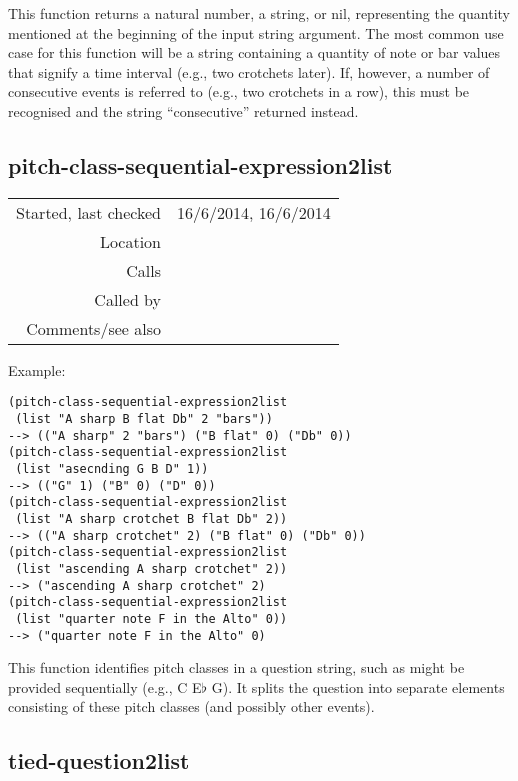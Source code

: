 \noindent This function returns a natural number, a
string, or nil, representing the quantity mentioned
at the beginning of the input string argument. The
most common use case for this function will be a
string containing a quantity of note or bar values
that signify a time interval (e.g., two crotchets
later). If, however, a number of consecutive events is
referred to (e.g., two crotchets in a row), this must
be recognised and the string ``consecutive'' returned
instead.


\subsection*{pitch-class-sequential-expression2list}\label{fun:pitch-class-sequential-expression2list}

\vspace{0.3cm}
\begin{tabular}{r|p{8cm}}
Started, last checked & 16/6/2014, 16/6/2014 \\
Location & \nameref{sec:analytic-string-manipulations} \\
Calls & \nameref{fun:positions-char} \\
Called by & \nameref{fun:followed-by-splitter} \\
Comments/see also & \nameref{fun:consecutive-question2list}
\end{tabular}

\vspace{0.5cm}
\noindent Example:
\begin{verbatim}
(pitch-class-sequential-expression2list
 (list "A sharp B flat Db" 2 "bars"))
--> (("A sharp" 2 "bars") ("B flat" 0) ("Db" 0))
(pitch-class-sequential-expression2list
 (list "asecnding G B D" 1))
--> (("G" 1) ("B" 0) ("D" 0))
(pitch-class-sequential-expression2list
 (list "A sharp crotchet B flat Db" 2))
--> (("A sharp crotchet" 2) ("B flat" 0) ("Db" 0))
(pitch-class-sequential-expression2list
 (list "ascending A sharp crotchet" 2))
--> ("ascending A sharp crotchet" 2)
(pitch-class-sequential-expression2list
 (list "quarter note F in the Alto" 0))
--> ("quarter note F in the Alto" 0)
\end{verbatim}

\noindent This function identifies pitch classes in a
question string, such as might be provided
sequentially (e.g., C E$\flat$ G). It splits the
question into separate elements consisting of these
pitch classes (and possibly other events).


\subsection*{tied-question2list}\label{fun:tied-question2list}


